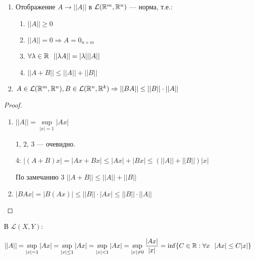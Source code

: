 \begin{theorem}
    \itemfix
    \begin{enumerate}
        \item Отображение $A \to ||A||$ в $\mathcal L(\mathbb{R}^m, \mathbb{R}^n)$ --- норма, т.е.:
              \begin{enumerate}
                  \item $||A|| \ge 0$
                  \item $||A|| = 0 \Rightarrow A = 0_{n \times m}$
                  \item $\forall \lambda \in \mathbb{R} \ \ ||\lambda A|| = |\lambda| ||A||$
                  \item $||A+B|| \le ||A|| + ||B||$
              \end{enumerate}
        \item $A\in \mathcal L(\mathbb{R}^m, \mathbb{R}^n), B\in \mathcal L(\mathbb{R}^n, \mathbb{R}^k) \Rightarrow ||BA|| \le ||B||\cdot ||A||$
    \end{enumerate}
\end{theorem}
\begin{proof}
    \itemfix
    \begin{enumerate}
        \item $||A|| = \sup\limits_{|x| = 1} |Ax|$

              1, 2, 3 --- очевидно.

              4: $|(A+B)x| = |Ax + Bx| \le |Ax| + |Bx| \le (||A|| + ||B||) |x|$

              По замечанию 3 $||A+B|| \le ||A|| + ||B||$
        \item $|BAx| = |B (Ax)| \le ||B||\cdot|Ax|\le ||B||\cdot||A||$
    \end{enumerate}
\end{proof}

\begin{remark}
    В $\mathcal L(X, Y)$:

    $$||A|| = \sup_{|x|=1} |Ax| = \sup_{|x| \le 1} |Ax| = \sup_{|x| < 1} |Ax| = \sup_{|x| \not= 0} \frac{|Ax|}{|x|} = \inf \{ C \in \mathbb{R} : \forall x \ \ |Ax| \le C|x|\}$$
\end{remark}

